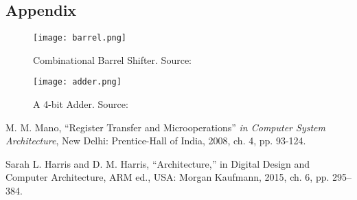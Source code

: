 \documentclass[12pt]{article}
\begin{document}
\subsection*{Appendix}

\begin{figure}[H]
\centering
\texttt{[image: barrel.png]}
\caption{Combinational Barrel Shifter.         Source: \cite{b1}}
\label{barrel}
\end{figure}

\begin{figure}[H]
\centering
\texttt{[image: adder.png]}
\caption{A 4-bit Adder.     Source: \cite{b1}}
\label{adder}
\end{figure}






\begin{thebibliography}{00}


 M. M. Mano, ``Register Transfer and Microoperations'' \emph{in Computer System Architecture}, New Delhi: Prentice-Hall of India, 2008, ch. 4, pp. 93-124.

 Sarah L. Harris and D. M. Harris, “Architecture,” in Digital Design and Computer Architecture, ARM ed., USA: Morgan Kaufmann, 2015, ch. 6, pp. 295–384. 

\end{thebibliography}
\end{document}
